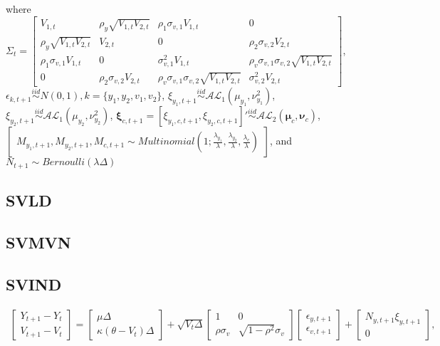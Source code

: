 \documentclass{article}
\begin{document}
where $\Sigma_{t} = \begin{bmatrix} V_{1,t} & \rho_y \sqrt{V_{1,t}V_{2,t}} & \rho_1 \sigma_{v,1} V_{1,t} & 0 \\ \rho_y \sqrt{V_{1,t}V_{2,t}} & V_{2,t} & 0 & \rho_2 \sigma_{v,2} V_{2,t} \\ \rho_1 \sigma_{v,1} V_{1,t} & 0 & \sigma_{v,1}^2 V_{1,t} & \rho_v \sigma_{v,1}\sigma_{v,2} \sqrt{V_{1,t} V_{2,t}} \\ 0 & \rho_2 \sigma_{v,2} V_{2,t} & \rho_v \sigma_{v,1}\sigma_{v,2} \sqrt{V_{1,t} V_{2,t}} & \sigma_{v,2}^2 V_{2,t} \end{bmatrix}$, \\$\epsilon_{k,t+1} \overset{iid}{\sim} N(0,1), k = \{y_1,y_2,v_1,v_2\}$, $\xi_{y_1,t+1} \overset{iid}{\sim} \mathcal{AL}_1(\mu_{y_1}, \nu_{y_1}^2)$, $\xi_{y_2,t+1} \overset{iid}{\sim} \mathcal{AL}_1(\mu_{y_2}, \nu_{y_2}^2)$, $\boldsymbol{\xi}_{c,t+1} = [\xi_{y_1,c,t+1}, \xi_{y_2,c,t+1}]' \overset{iid}{\sim} \mathcal{AL}_2(\boldsymbol{\mu}_c, \boldsymbol{\nu}_c)$, $\begin{bmatrix}
M_{y_1,t+1},M_{y_2,t+1},M_{c,t+1} \sim Multinomial(1;\frac{\lambda_{y_1}}{\lambda},\frac{\lambda_{y_2}}{\lambda},\frac{\lambda_c}{\lambda})
\end{bmatrix}$, and $N_{t+1} \sim Bernoulli(\lambda\Delta)$

\subsection{SVLD}

\subsection{SVMVN}

\subsection{SVIND}
\begin{align}
    \begin{bmatrix} Y_{t+1} - Y_t \\ V_{t+1} - V_t \end{bmatrix} = \begin{bmatrix}\mu\Delta \\ \kappa(\theta - V_{t})\Delta\end{bmatrix}  + \sqrt{V_{t}\Delta} \begin{bmatrix} 1 & 0 \\ \rho \sigma_v & \sqrt{1 - \rho^2} \sigma_v \end{bmatrix} \begin{bmatrix} \epsilon_{y,t+1} \\ \epsilon_{v,t+1} \end{bmatrix} + \begin{bmatrix} N_{y,t+1} \xi_{y,t+1} \\0  \end{bmatrix}, \label{S_tdisc}
\end{align}
\end{document}
